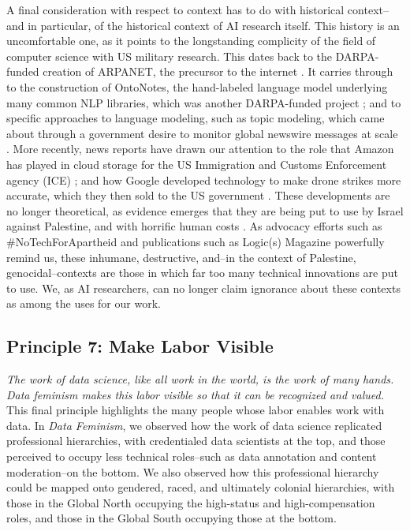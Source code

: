 A final consideration with respect to context has to do with historical context–and in particular, of the historical context of AI research itself. This history is an uncomfortable one, as it points to the longstanding complicity of the field of computer science with US military research. This dates back to the DARPA-funded creation of ARPANET, the precursor to the internet \cite{darpa}. It carries through to the construction of OntoNotes, the hand-labeled language model underlying many common NLP libraries, which was another DARPA-funded project \cite{4338389}; and to specific approaches to language modeling, such as topic modeling, which came about through a government desire to monitor global newswire messages at scale \cite{binder_2016}. More recently, news reports have drawn our attention to the role that Amazon has played in cloud storage for the US Immigration and Customs Enforcement agency (ICE) \cite{hao_2018}; and how Google developed technology to make drone strikes more accurate, which they then sold to the US government \cite{Project_Maven}. These developments are no longer theoretical, as evidence emerges that they are being put to use by Israel against Palestine, and with horrific human costs \cite{Davies_McKernan_Sabbagh_2023}. As advocacy efforts such as \#NoTechForApartheid \cite{notechforapartheid} and publications such as Logic(s) Magazine \cite{Logics} powerfully remind us, these inhumane, destructive, and–in the context of Palestine, genocidal–contexts are those in which far too many technical innovations are put to use. We, as AI researchers, can no longer claim ignorance about these contexts as among the uses for our work.

\subsection{Principle 7: Make Labor Visible}

\textit{The work of data science, like all work in the world, is the work of many hands. Data feminism makes this labor visible so that it can be recognized and valued. }
\\[5pt]
This final principle highlights the many people whose labor enables work with data. In \textit{Data Feminism}, we observed how the work of data science replicated professional hierarchies, with credentialed data scientists at the top, and those perceived to occupy less technical roles–such as data annotation and content moderation–on the bottom. We also observed how this professional hierarchy could be mapped onto gendered, raced, and ultimately colonial hierarchies, with those in the Global North occupying the high-status and high-compensation roles, and those in the Global South occupying those at the bottom. 

